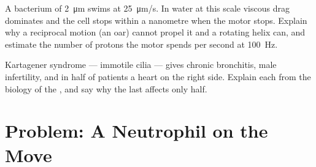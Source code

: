 \begin{exercise}[$\star\star\star$]\label{exo:b3:cytoskeleton-motility:11}
A bacterium of \qty{2}{\micro m} swims at \qty{25}{\micro m/s}. In
water at this scale viscous drag dominates and the cell stops within a
nanometre when the motor stops. Explain why a reciprocal motion (an
oar) cannot propel it and a rotating helix can, and estimate the
number of protons the motor spends per second at \qty{100}{Hz}.
\end{exercise}

\begin{exercise}[$\star\star\star$]\label{exo:b3:cytoskeleton-motility:12}
Kartagener syndrome --- immotile cilia --- gives chronic bronchitis,
male infertility, and in half of patients a heart on the right side.
Explain each from the biology of the , and say why the last
affects only half.
\end{exercise}

\section{Problem: A Neutrophil on the Move}

